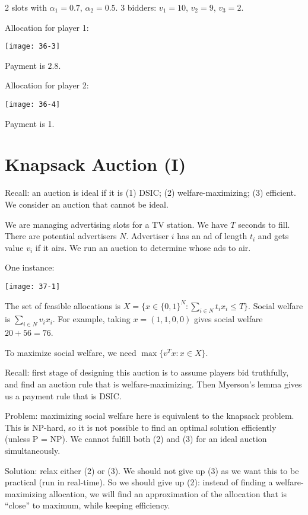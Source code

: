 \documentclass[12pt,letterpaper]{report}
\begin{document}
\begin{ex}
  2 slots with $\alpha_1 = 0.7$, $\alpha_2 = 0.5$.
  3 bidders: $v_1 = 10$, $v_2 = 9$, $v_3 = 2$.

  Allocation for player 1:
  \begin{center}
    \texttt{[image: 36-3]}
  \end{center}
  Payment is $2.8$.

  Allocation for player 2:
  \begin{center}
    \texttt{[image: 36-4]}
  \end{center}
  Payment is 1.
\end{ex}

\section{Knapsack Auction (I)}

Recall: an auction is ideal if it is (1) DSIC; (2) welfare-maximizing; (3) efficient.
We consider an auction that cannot be ideal.

\begin{ex}
  We are managing advertising slots for a TV station.
  We have $T$ seconds to fill.
  There are potential advertisers $N$.
  Advertiser $i$ has an ad of length $t_i$ and gets value $v_i$ if it airs.
  We run an auction to determine whose ads to air.

  One instance:
  \begin{center}
    \texttt{[image: 37-1]}
  \end{center}
  The set of feasible allocations is $X = \{ x \in \{0, 1\}^N : \sum_{i \in N} t_i x_i \leq T \}$.
  Social welfare is $\sum_{i \in N} v_i x_i$.
  For example, taking $x = (1, 1, 0, 0)$ gives social welfare $20 + 56 = 76$.

  To maximize social welfare, we need $\max \{ v^T x : x \in X \}$.

  Recall: first stage of designing this auction is to assume players bid truthfully, and find an
  auction rule that is welfare-maximizing.
  Then Myerson's lemma gives us a payment rule that is DSIC.

  Problem: maximizing social welfare here is equivalent to the knapsack problem.
  This is NP-hard, so it is not possible to find an optimal solution efficiently (unless P = NP).
  We cannot fulfill both (2) and (3) for an ideal auction simultaneously.

  Solution: relax either (2) or (3).
  We should not give up (3) as we want this to be practical (run in real-time).
  So we should give up (2): instead of finding a welfare-maximizing allocation, we will find an
  approximation of the allocation that is ``close'' to maximum, while keeping efficiency.
\end{ex}

\end{document}
